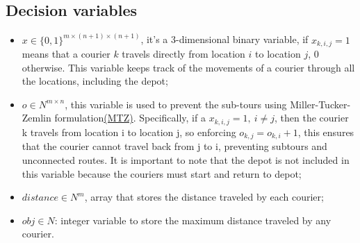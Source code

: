\documentclass{article}
\begin{document}
\subsection{Decision variables}
\begin{itemize}
    \item 
    $x \in \{0,1\}^{m \times (n+1) \times (n+1)}$, it's a 3-dimensional binary variable, if $x_{k,i,j} = 1$ means that a courier $k$ travels directly from location $i$ to location $j$, 0 otherwise. This variable keeps track of the movements of a courier through all the locations, including the depot;
    \item
    $o \in N^{m \times n}$, this variable is used to prevent the sub-tours using Miller-Tucker-Zemlin formulation\href{https://phabe.ch/2021/09/19/tsp-subtour-elimination-by-miller-tucker-zemlin-constraint/}{(MTZ)}. Specifically, if a $x_{k,i,j} = 1, \:i\ne j$, then the courier k travels from location i to location j, so enforcing $o_{k,j} = o_{k,i} + 1$, this ensures that the courier cannot travel back from j to i, preventing subtours and unconnected routes. It is important to note that the depot is not included in this variable because the couriers must start and return to depot;
\item
    $distance \in N^m$, array that stores the distance traveled by each courier;
\item
    $obj \in N$: integer variable to store the maximum distance traveled by any courier. 
\end{itemize}
\end{document}
